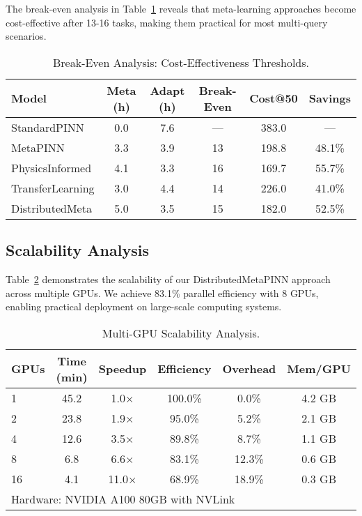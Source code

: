 \documentclass[review]{elsarticle}
\begin{document}
The break-even analysis in Table~\ref{tab:break_even_analysis} reveals that meta-learning approaches become cost-effective after 13-16 tasks, making them practical for most multi-query scenarios.

\begin{table}[htbp]
\centering
\caption{Break-Even Analysis: Cost-Effectiveness Thresholds.}
\label{tab:break_even_analysis}
\small
\begin{tabular}{lccccc}
\toprule
\textbf{Model} & \textbf{Meta (h)} & \textbf{Adapt (h)} & \textbf{Break-Even} & \textbf{Cost@50} & \textbf{Savings} \\
\midrule
StandardPINN & 0.0 & 7.6 & --- & 383.0 & --- \\
MetaPINN & 3.3 & 3.9 & 13 & 198.8 & 48.1\% \\
PhysicsInformed & 4.1 & 3.3 & 16 & 169.7 & 55.7\% \\
TransferLearning & 3.0 & 4.4 & 14 & 226.0 & 41.0\% \\
DistributedMeta & 5.0 & 3.5 & 15 & 182.0 & 52.5\% \\
\bottomrule
\end{tabular}
\end{table}

\subsection{Scalability Analysis}

Table~\ref{tab:scalability_analysis} demonstrates the scalability of our DistributedMetaPINN approach across multiple GPUs. We achieve 83.1\% parallel efficiency with 8 GPUs, enabling practical deployment on large-scale computing systems.

\begin{table}[htbp]
\centering
\caption{Multi-GPU Scalability Analysis.}
\label{tab:scalability_analysis}
\small
\begin{tabular}{lccccc}
\toprule
\textbf{GPUs} & \textbf{Time (min)} & \textbf{Speedup} & \textbf{Efficiency} & \textbf{Overhead} & \textbf{Mem/GPU} \\
\midrule
1 & 45.2 & 1.0× & 100.0\% & 0.0\% & 4.2 GB \\
2 & 23.8 & 1.9× & 95.0\% & 5.2\% & 2.1 GB \\
4 & 12.6 & 3.5× & 89.8\% & 8.7\% & 1.1 GB \\
8 & 6.8 & 6.6× & 83.1\% & 12.3\% & 0.6 GB \\
16 & 4.1 & 11.0× & 68.9\% & 18.9\% & 0.3 GB \\
\bottomrule
\multicolumn{6}{l}{\footnotesize Hardware: NVIDIA A100 80GB with NVLink} \\
\end{tabular}
\end{table}
\end{document}
